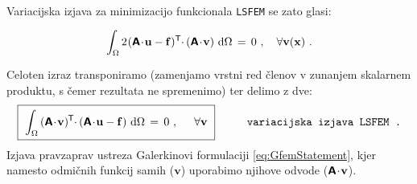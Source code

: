 Variacijska izjava za minimizacijo funkcionala \texttt{LSFEM} se zato glasi:
\begin{equation*}
	\int_{\Omega} 2 \mkern1mu (\mathbsf{A} \! \cdot \! \mathbf{u} - \mathbf{f})^\mathsf{T} \mkern-4.5mu \cdot \mkern-1mu (\mathbsf{A} \! \cdot \! \mathbf{v}) \ \ud \Omega \, = \, 0 \ , \quad \forall \mathbf{v(\mathbf{x})} \ . \vphantom{\Biggr{)}}
\end{equation*}
Celoten izraz transponiramo (zamenjamo vrstni red členov v zunanjem skalarnem produktu, s čemer rezultata ne spremenimo) ter delimo z dve:
\begin{equation}
	\boxed{\
		\int_{\Omega} \, (\mathbsf{A} \! \cdot \! \mathbf{v})^\mathsf{\mkern-1mu T} \mkern-4.5mu \cdot \mkern-1mu (\mathbsf{A} \! \cdot \! \mathbf{u} - \mathbf{f}) \ \ud \Omega \, = \,
		0 \ , \hspace{5mm} \forall \mathbf{v} \vphantom{\bigg{)}} \
	}
	\hspace{10mm} \texttt{variacijska izjava LSFEM .}
	\label{eq:LsfemVariationalStatement}
\end{equation}
Izjava pravzaprav ustreza Galerkinovi formulaciji \eqref{eq:GfemStatement}, kjer namesto odmičnih funkcij samih ($\mathbf{v}$) uporabimo njihove odvode ($\bm{\mathsf{A}} \! \cdot \! \mathbf{v}$).